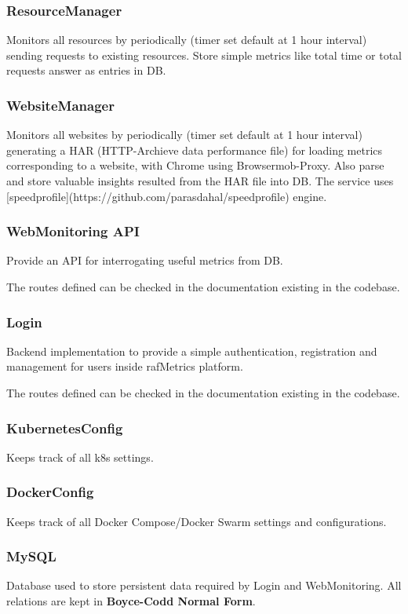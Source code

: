 \subsubsection{ResourceManager}
Monitors all resources by periodically (timer set default at 1 hour interval) sending requests to existing resources.
Store simple metrics like total time or total requests answer as entries in DB. 

\subsubsection{WebsiteManager}
Monitors all websites by periodically (timer set default at 1 hour interval) generating a HAR (HTTP-Archieve data performance file) for loading metrics corresponding to a website, with Chrome using Browsermob-Proxy.
Also parse and store valuable insights resulted from the HAR file into DB. 
The service uses [speedprofile](https://github.com/parasdahal/speedprofile) engine.

\subsubsection{WebMonitoring API}
Provide an API for interrogating useful metrics from DB.

The routes defined can be checked in the documentation existing in the codebase.


\subsubsection{Login}
Backend implementation to provide a simple authentication, registration and management for users inside rafMetrics platform.

The routes defined can be checked in the documentation existing in the codebase.


\subsubsection{KubernetesConfig}
Keeps track of all k8s settings.

\subsubsection{DockerConfig}
Keeps track of all Docker Compose/Docker Swarm settings and configurations.

\subsubsection{MySQL}
Database used to store persistent data required by Login and WebMonitoring.
All relations are kept in \textbf{Boyce-Codd Normal Form}.


